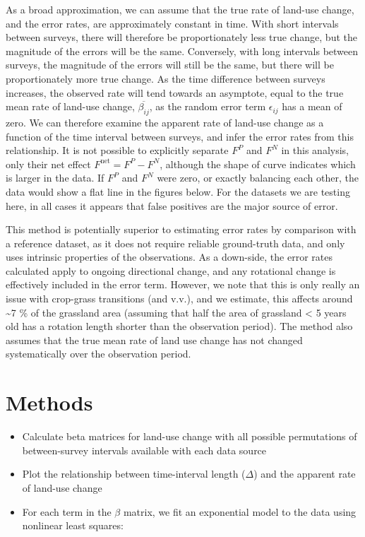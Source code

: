 \documentclass[
]{book}
\providecommand{\tightlist}{%
  \setlength{\itemsep}{0pt}\setlength{\parskip}{0pt}}
\begin{document}
As a broad approximation, we can assume that the true rate of land-use change, and the error rates, are approximately constant in time. With short intervals between surveys, there will therefore be proportionately less true change, but the magnitude of the errors will be the same. Conversely, with long intervals between surveys, the magnitude of the errors will still be the same, but there will be proportionately more true change.
As the time difference between surveys increases, the observed rate will tend towards an asymptote, equal to the true mean rate of land-use change, \(\overline{\beta_{ij}}\), as the random error term \(\epsilon_{ij}\) has a mean of zero.
We can therefore examine the apparent rate of land-use change as a function of the time interval between surveys, and infer the error rates from this relationship.
It is not possible to explicitly separate \(F^{P}\) and \(F^{N}\) in this analysis, only their net effect \(F^{\mathrm{net}} = F^{P} - F^{N}\), although the shape of curve indicates which is larger in the data. If \(F^{P}\) and \(F^{N}\) were zero, or exactly balancing each other, the data would show a flat line in the figures below. For the datasets we are testing here, in all cases it appears that false positives are the major source of error.

This method is potentially superior to estimating error rates by comparison with a reference dataset, as it does not require reliable ground-truth data, and only uses intrinsic properties of the observations. As a down-side, the error rates calculated apply to ongoing directional change, and any rotational change is effectively included in the error term. However, we note that this is only really an issue with crop-grass transitions (and v.v.), and we estimate, this affects around \textasciitilde7 \% of the grassland area (assuming that half the area of grassland \textless{} 5 years old has a rotation length shorter than the observation period). The method also assumes that the true mean rate of land use change has not changed systematically over the observation period.

\hypertarget{methods-2}{%
\section{Methods}\label{methods-2}}

\begin{itemize}
\tightlist
\item
  Calculate beta matrices for land-use change with all possible permutations of between-survey intervals available with each data source
\item
  Plot the relationship between time-interval length (\(\Delta\)) and the apparent rate of land-use change
\item
  For each term in the \(\beta\) matrix, we fit an exponential model to the data using nonlinear least squares:
\end{itemize}
\end{document}
